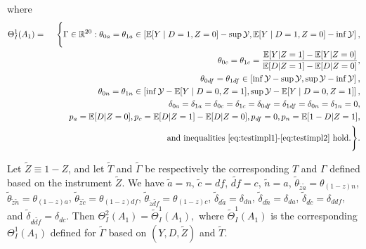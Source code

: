 \documentclass[12pt]{article}
\theoremstyle{plain}
\theoremstyle{definition}
\theoremstyle{remark}
\begin{document}
where  
\begin{eqnarray*}
    \Theta_I^1(A_1) &=& \Bigg \{\Gamma \in \mathbb R^{20}: \theta_{0a}=\theta_{1a} \in \left[\mathbb E[Y\mid D=1, Z=0]-\sup \mathcal Y, \mathbb E[Y\mid D=1, Z=0]-\inf \mathcal Y\right],\\
   && \qquad \theta_{0c}=\theta_{1c}=\frac{\mathbb E[Y\vert Z=1]-\mathbb E[Y\vert Z=0]}{\mathbb E[D\vert Z=1]-\mathbb E[D\vert Z=0]},\\
   && \qquad \theta_{0df}=\theta_{1df} \in \left[\inf \mathcal Y-\sup \mathcal Y, \sup \mathcal Y-\inf \mathcal Y\right],\\
   && \qquad \theta_{0n}=\theta_{1n} \in \left[\inf \mathcal Y-\mathbb E[Y\mid D=0, Z=1], \sup \mathcal Y-\mathbb E[Y\mid D=0, Z=1]\right],\\ 
   && \qquad \delta_{0a}=\delta_{1a}=\delta_{0c}=\delta_{1c}=\delta_{0df}=\delta_{1df}=\delta_{0n}=\delta_{1n}=0,\\
   && \qquad p_a=\mathbb{E}[D  \vert  Z=0], p_c=\mathbb{E}[D  \vert  Z=1] - \mathbb{E}[D  \vert  Z=0], p_{df}=0, p_n=\mathbb{E}[1-D  \vert  Z=1],\\
   && \qquad \text{and inequalities \eqref{eq:testimpl1}-\eqref{eq:testimpl2} hold.} \Bigg \}.
\end{eqnarray*}

Let $\tilde{Z}\equiv 1-Z$, and let $\tilde{T}$ and $\tilde{\Gamma}$ be respectively the corresponding $T$ and $\Gamma$ defined based on the instrument $\tilde{Z}$. We have $\tilde{a}=n$, $\tilde{c}=df$, $\tilde{df}=c$, $\tilde{n}=a$, $\tilde{\theta}_{\tilde{z}\tilde{a}}=\theta_{(1-z)n}$, $\tilde{\theta}_{\tilde{z}\tilde{n}}=\theta_{(1-z)a}$, $\tilde{\theta}_{\tilde{z}\tilde{c}}=\theta_{(1-z)df}$, $\tilde{\theta}_{\tilde{z}\tilde{df}}=\theta_{(1-z)c}$, $\tilde{\delta}_{d\tilde{a}}=\delta_{dn}$, $\tilde{\delta}_{d\tilde{n}}=\delta_{da}$, $\tilde{\delta}_{d\tilde{c}}=\delta_{d df}$, and $\tilde{\delta}_{d\tilde{df}}=\delta_{dc}$. Then $\Theta_I^2(A_1)=\tilde{\Theta}_I^1(A_1),$ where $\tilde{\Theta}_I^1(A_1)$ is the corresponding $\Theta_I^1(A_1)$ defined for $\tilde{\Gamma}$ based on $(Y,D,\tilde{Z})$ and $\tilde{T}$.
\end{document}
